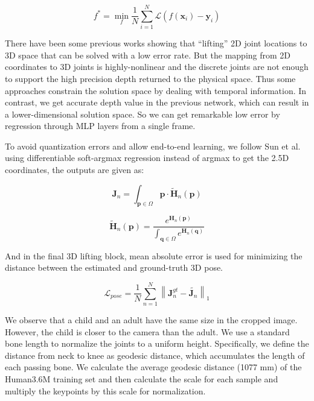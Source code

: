\documentclass[letterpaper]{article} \usepackage{aaai21}  \usepackage{times}  \usepackage{helvet} \usepackage{courier}  \usepackage[hyphens]{url}  \usepackage{graphicx} \urlstyle{rm} \def\UrlFont{\rm}  \usepackage{natbib}  \usepackage{caption} \frenchspacing  \setlength{\pdfpagewidth}{8.5in}  \setlength{\pdfpageheight}{11in}
\begin{document}
\begin{equation}
f^{*}=\min _{f} \frac{1}{N} \sum_{i=1}^{N} \mathcal{L}\left(f\left(\mathbf{x}_{i}\right)-\mathbf{y}_{i}\right)
\end{equation}

There have been some previous works showing that “lifting” 2D joint locations to 3D space that can be solved with a low error rate. But the mapping from 2D coordinates to 3D joints is highly-nonlinear and the discrete joints are not enough to support the high precision depth returned to the physical space. Thus some approaches constrain the solution space by dealing with temporal information. In contrast, we get accurate depth value in the previous network, which can result in a lower-dimensional solution space. So we can get remarkable low error by regression through MLP layers from a single frame.


To avoid quantization errors and allow end-to-end learning, we follow Sun et al. using differentiable soft-argmax regression instead of argmax to get the 2.5D coordinates, the outputs are given as:

\begin{equation}
\mathbf{J}_{n}=\int_{\mathbf{p} \in \Omega} \mathbf{p} \cdot \tilde{\mathbf{H}}_{n}(\mathbf{p})
\end{equation}

\begin{equation}
\tilde{\mathbf{H}}_{n}(\mathbf{p})=\frac{e^{\mathbf{H}_{n}(\mathbf{p})}}{\int_{\mathbf{q} \in \Omega} e^{\mathbf{H}_{n}(\mathbf{q})}}
\end{equation}

And in the final 3D lifting block, mean absolute error is used for minimizing the distance between the estimated and ground-truth 3D pose.

\begin{equation}
\mathcal{L}_{p o s e}=\frac{1}{N} \sum_{n=1}^{N}\left\|\mathbf{J}_{n}^{gt}-\tilde{\mathbf{J}_{n}}\right\|_{1}
\end{equation}



We observe that a child and an adult have the same size in the cropped image. However, the child is closer to the camera than the adult. We use a standard bone length to normalize the joints to a uniform height. Specifically, we define the distance from neck to knee as geodesic distance, which accumulates the length of each passing bone. We calculate the average geodesic distance (1077 mm) of the Human3.6M training set and then calculate the scale for each sample and multiply the keypoints by this scale for normalization.
\end{document}
